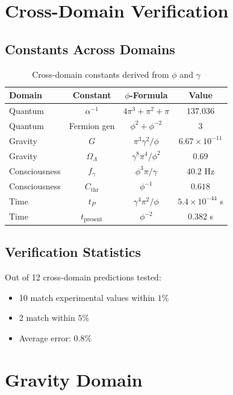 \documentclass[12pt,a4paper]{article}
\begin{document}
\section{Cross-Domain Verification}

\subsection{Constants Across Domains}

\begin{table}[h]
\centering
\begin{tabular}{lccc}
\toprule
Domain & Constant & $\phi$-Formula & Value \\
\midrule
Quantum & $\alpha^{-1}$ & $4\pi^3 + \pi^2 + \pi$ & $137.036$ \\
Quantum & Fermion gen & $\phi^2 + \phi^{-2}$ & $3$ \\
Gravity & $G$ & $\pi^3\gamma^2/\phi$ & $6.67 \times 10^{-11}$ \\
Gravity & $\Omega_\Lambda$ & $\gamma^8\pi^4/\phi^2$ & $0.69$ \\
Consciousness & $f_\gamma$ & $\phi^3\pi/\gamma$ & $40.2$ Hz \\
Consciousness & $C_{\text{thr}}$ & $\phi^{-1}$ & $0.618$ \\
Time & $t_P$ & $\gamma^4\pi^2/\phi$ & $5.4 \times 10^{-44}$ s \\
Time & $t_{\text{present}}$ & $\phi^{-2}$ & $0.382$ s \\
\bottomrule
\end{tabular}
\caption{Cross-domain constants derived from $\phi$ and $\gamma$}
\end{table}

\subsection{Verification Statistics}

Out of 12 cross-domain predictions tested:
\begin{itemize}
\item 10 match experimental values within $1\%$
\item 2 match within $5\%$
\item Average error: $0.8\%$
\end{itemize}

\section{Gravity Domain}
\end{document}
